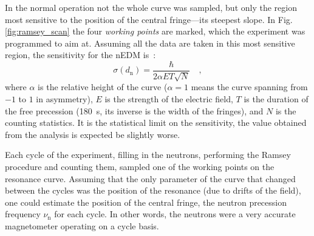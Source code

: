 In the normal operation not the whole curve was sampled, but only the region most sensitive to the position of the central fringe---its steepest slope. In Fig.\,\ref{fig:ramsey_scan} the four \emph{working points} are marked, which the experiment was programmed to aim at. Assuming all the data are taken in this most sensitive region, the sensitivity for the nEDM is~\cite{FertlThesis}:
\begin{equation}
  \label{eq:nEDM_sensitivity}
  \sigma(d_\text{n}) = \frac{\hbar}{ 2 \alpha E T \sqrt{N} } \quad ,
\end{equation}
where $\alpha$ is the relative height of the curve ($\alpha = 1$ means the curve spanning from $-1$ to $1$ in asymmetry), $E$ is the strength of the electric field, $T$ is the duration of the free precession (\SI{180}{\second}, its inverse is the width of the fringes), and $N$ is the counting statistics. It is the statistical limit on the sensitivity, the value obtained from the analysis is expected be slightly worse.

Each cycle of the experiment, filling in the neutrons, performing the Ramsey procedure and counting them, sampled one of the working points on the resonance curve. Assuming that the only parameter of the curve that changed between the cycles was the position of the resonance (due to drifts of the field), one could estimate the position of the central fringe, the neutron precession frequency $\nu_\text{n}$ for each cycle. In other words, the neutrons were a very accurate magnetometer operating on a cycle basis.

